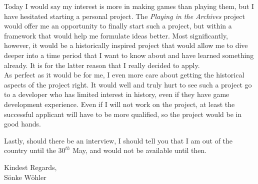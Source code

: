 \documentclass[paper=a4,fontsize=11pt]{scrartcl} %
\newcommand{\sepspace}{\vspace*{1em}}		%
\begin{document}
  \noindent
  Today I would say my interest is more in making games than playing them, but I have hesitated starting a personal project. The \textit{Playing in the Archives} project would offer me an opportunity to finally start such a project, but within a framework that would help me formulate ideas better. Most significantly, however, it would be a historically inspired project that would allow me to dive deeper into a time period that I want to know about and have learned something already. It is for the latter reason that I really decided to apply. \\
  As perfect as it would be for me, I even more care about getting the historical aspects of the project right. It would well and truly hurt to see such a project go to a developer who has limited interest in history, even if they have game development experience. Even if I will not work on the project, at least the successful applicant will have to be more qualified, so the project would be in good hands.
  \sepspace
  
  \noindent
  Lastly, should there be an interview, I should tell you that I am out of the country until the $30^{th}$ May, and would not be available until then.


  \sepspace
  
  \noindent
  Kindest Regards, \\
  S\"onke W\"ohler
  
  
  
\end{document}
